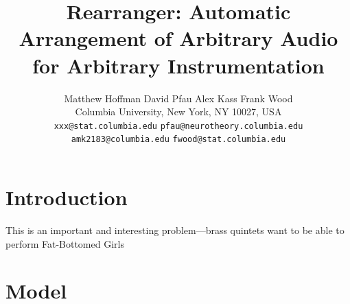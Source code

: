 \documentclass{article}
\title{Rearranger: Automatic Arrangement of Arbitrary Audio for
  Arbitrary Instrumentation}
\author{
Matthew Hoffman \hspace{1cm} David Pfau \hspace{1cm} Alex Kass \hspace{1cm} Frank Wood \\
Columbia University, New York, NY 10027, USA \\
\texttt{xxx@stat.columbia.edu}
\texttt{pfau@neurotheory.columbia.edu} 
\texttt{amk2183@columbia.edu}
\texttt{fwood@stat.columbia.edu}
}
\begin{document}
\maketitle

\section{Introduction}

This is an important and interesting problem---brass quintets want to be
able to perform Fat-Bottomed Girls

\section{Model}










\newpage


\begin{small}

 
%
\end{small}
\end{document}
